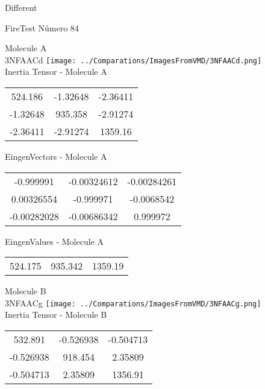 \begin{center}
\vtab
\vtab
\textcolor{NavyBlue}{\Large Different}
\end{center}

 \newpage

\vtab[-2cm]
\begin{center}
{\large FireTest \tab Número 84}
\end{center}
\begin{multicols}{2}
\begin{center}

Molecule A \\ 
3NFAACd
\texttt{[image: ../Comparations/ImagesFromVMD/3NFAACd.png]}
\\
Inertia Tensor - Molecule A \\
\vtab

\begin{tabular}{|c c c|}
524.186	 & 	-1.32648	 & 	-2.36411	 \\
-1.32648	 & 	935.358	 & 	-2.91274	 \\
-2.36411	 & 	-2.91274	 & 	1359.16
\end{tabular}

\vtab
 EingenVectors - Molecule A     \\
\vtab
\begin{tabular}{|c c c|}
-0.999991	 & 	-0.00324612	 & 	-0.00284261	 \\
0.00326554	 & 	-0.999971	 & 	-0.0068542	 \\
-0.00282028	 & 	-0.00686342	 & 	0.999972
\end{tabular}

\vtab
 EingenValues - Molecule A     \\
\vtab
\begin{tabular}{|c c c|}
524.175	 & 	935.342	 & 	1359.19	 \\
\end{tabular}
\columnbreak

Molecule B \\ 
3NFAACg
\texttt{[image: ../Comparations/ImagesFromVMD/3NFAACg.png]}
\\
Inertia Tensor - Molecule B \\
\vtab

\begin{tabular}{|c c c|}
532.891	 & 	-0.526938	 & 	-0.504713	 \\
-0.526938	 & 	918.454	 & 	2.35809	 \\
-0.504713	 & 	2.35809	 & 	1356.91
\end{tabular}


\end{center}
\end{multicols}
